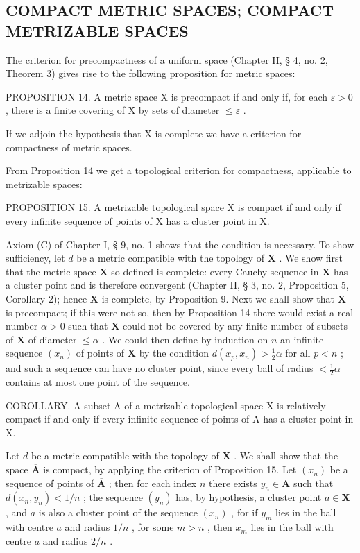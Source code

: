\subsection{COMPACT METRIC SPACES; COMPACT METRIZABLE SPACES}

The criterion for precompactness of a uniform space (Chapter II, § 4, no. 2, Theorem 3) gives rise to the following proposition for metric spaces:

PROPOSITION 14. A metric space X is precompact if and only if, for each \(\varepsilon > 0\) , there is a finite covering of X by sets of diameter \(\leqslant \varepsilon\) .

If we adjoin the hypothesis that X is complete we have a criterion for compactness of metric spaces.

From Proposition 14 we get a topological criterion for compactness, applicable to metrizable spaces:

PROPOSITION 15. A metrizable topological space X is compact if and only if every infinite sequence of points of X has a cluster point in X.

Axiom (C) of Chapter I, § 9, no. 1 shows that the condition is necessary. To show sufficiency, let \(d\) be a metric compatible with the topology of \(\mathbf{X}\) . We show first that the metric space \(\mathbf{X}\) so defined is complete: every Cauchy sequence in \(\mathbf{X}\) has a cluster point and is therefore convergent (Chapter II, § 3, no. 2, Proposition 5, Corollary 2); hence \(\mathbf{X}\) is complete, by Proposition 9. Next we shall show that \(\mathbf{X}\) is precompact; if this were not so, then by Proposition 14 there would exist a real number \(\alpha > 0\) such that \(\mathbf{X}\) could not be covered by any finite number of subsets of \(\mathbf{X}\) of diameter \(\leqslant \alpha\) . We could then define by induction on \(n\) an infinite sequence \((x_n)\) of points of \(\mathbf{X}\) by the condition \(d(x_p, x_n) > \frac{1}{2} \alpha\) for all \(p < n\) ; and such a sequence can have no cluster point, since every ball of radius \(< \frac{1}{2} \alpha\) contains at most one point of the sequence.

COROLLARY. A subset A of a metrizable topological space X is relatively compact if and only if every infinite sequence of points of A has a cluster point in X.

Let \(d\) be a metric compatible with the topology of \(\mathbf{X}\) . We shall show that the space \(\overline{\mathbf{A}}\) is compact, by applying the criterion of Proposition 15. Let \((x_{n})\) be a sequence of points of \(\overline{\mathbf{A}}\) ; then for each index \(n\) there exists \(y_{n} \in \mathbf{A}\) such that \(d(x_{n}, y_{n}) < 1/n\) ; the sequence \((y_{n})\) has, by hypothesis, a cluster point \(a \in \mathbf{X}\) , and \(a\) is also a cluster point of the sequence \((x_{n})\) , for if \(y_{m}\) lies in the ball with centre \(a\) and radius \(1/n\) , for some \(m > n\) , then \(x_{m}\) lies in the ball with centre \(a\) and radius \(2/n\) .

